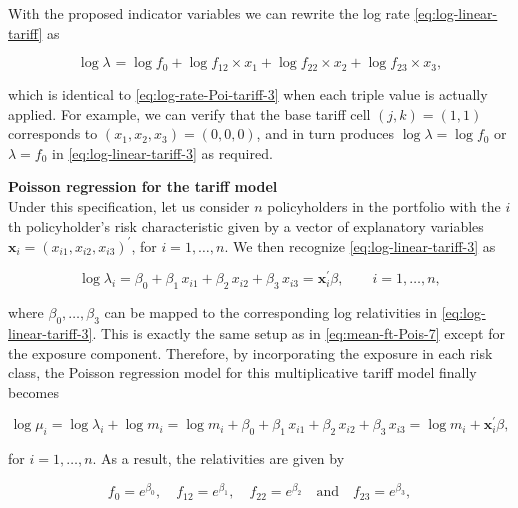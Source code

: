 \documentclass[]{book}
\theoremstyle{definition}
\theoremstyle{definition}
\theoremstyle{definition}
\theoremstyle{remark}
\begin{document}
With the proposed indicator variables we can rewrite the log rate
\eqref{eq:log-linear-tariff} as

\begin{equation}
\log \lambda_{}= \log f_0+ \log f_{12}  \times x_1 + \log f_{22} \times x_2 +\log f_{23} \times x_3,
\label{eq:log-linear-tariff-3}
\end{equation}

which is identical to \eqref{eq:log-rate-Poi-tariff-3} when each triple
value is actually applied. For example, we can verify that the base
tariff cell \((j,k)=(1,1)\) corresponds to \((x_1, x_2,x_3)=(0, 0, 0)\),
and in turn produces \(\log \lambda=\log f_0\) or \(\lambda= f_0\) in
\eqref{eq:log-linear-tariff-3} as required.

\textbf{Poisson regression for the tariff model}\\
Under this specification, let us consider \(n\) policyholders in the
portfolio with the \(i\)th policyholder's risk characteristic given by a
vector of explanatory variables
\(\mathbf{ x}_i=(x_{i1}, x_{i2},x_{i3})^{\prime}\), for
\(i=1, \ldots, n\). We then recognize \eqref{eq:log-linear-tariff-3} as

\begin{equation}
\log \lambda_{i}= \beta_0+ \beta_1 \, x_{i1} + \beta_{2} \, x_{i2} +\beta_3  \, x_{i3}=\mathbf{ x}^{\prime}_i\beta, \qquad i=1, \ldots, n,
\end{equation}

where \(\beta_0, \ldots, \beta_3\) can be mapped to the corresponding
log relativities in \eqref{eq:log-linear-tariff-3}. This is exactly the
same setup as in \eqref{eq:mean-ft-Pois-7} except for the exposure
component. Therefore, by incorporating the exposure in each risk class,
the Poisson regression model for this multiplicative tariff model
finally becomes

\begin{equation}
\log \mu_i=\log \lambda_{i}+\log m_i= \log m_i+ \beta_0+ \beta_1 \, x_{i1} + \beta_{2} \, x_{i2} +\beta_3  \, x_{i3}=\log m_i+\mathbf{ x}^{\prime}_i\beta, 
\end{equation}

for \(i=1, \ldots, n\). As a result, the relativities are given by

\begin{equation}
{f}_0=e^{\beta_0}, \quad {f}_{12}=e^{\beta_1}, \quad {f}_{22}=e^{\beta_2} \quad \text{and}\quad {f}_{23}=e^{\beta_3},
\label{eq:relativity-1}
\end{equation}
\end{document}
